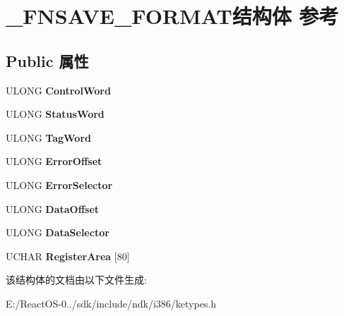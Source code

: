 \hypertarget{struct___f_n_s_a_v_e___f_o_r_m_a_t}{}\section{\+\_\+\+F\+N\+S\+A\+V\+E\+\_\+\+F\+O\+R\+M\+A\+T结构体 参考}
\label{struct___f_n_s_a_v_e___f_o_r_m_a_t}
\subsection*{Public 属性}
\begin{DoxyCompactItemize}
\item 
\mbox{\label{struct___f_n_s_a_v_e___f_o_r_m_a_t_a271b5eef143942d0124b66e91dc8d896}} 
U\+L\+O\+NG {\bfseries Control\+Word}
\item 
\mbox{\label{struct___f_n_s_a_v_e___f_o_r_m_a_t_a2450fb3d524034aa71d8af7565a6ac7a}} 
U\+L\+O\+NG {\bfseries Status\+Word}
\item 
\mbox{\label{struct___f_n_s_a_v_e___f_o_r_m_a_t_a028f79f9a88dfe9270a090e549135d46}} 
U\+L\+O\+NG {\bfseries Tag\+Word}
\item 
\mbox{\label{struct___f_n_s_a_v_e___f_o_r_m_a_t_a6805826043e53f9fd5b57f3bca22132d}} 
U\+L\+O\+NG {\bfseries Error\+Offset}
\item 
\mbox{\label{struct___f_n_s_a_v_e___f_o_r_m_a_t_a64fafbe9cf2dd89410d27ed52f0d86a1}} 
U\+L\+O\+NG {\bfseries Error\+Selector}
\item 
\mbox{\label{struct___f_n_s_a_v_e___f_o_r_m_a_t_a3081d555487a66e1555b69d1e7921725}} 
U\+L\+O\+NG {\bfseries Data\+Offset}
\item 
\mbox{\label{struct___f_n_s_a_v_e___f_o_r_m_a_t_a607d6e3a6131fdf6ce3d70ef69a8b929}} 
U\+L\+O\+NG {\bfseries Data\+Selector}
\item 
\mbox{\label{struct___f_n_s_a_v_e___f_o_r_m_a_t_a39c6b4de8d3ddf2361e72930966dab35}} 
U\+C\+H\+AR {\bfseries Register\+Area} \mbox{[}80\mbox{]}
\end{DoxyCompactItemize}


该结构体的文档由以下文件生成\+:\begin{DoxyCompactItemize}
\item 
E\+:/\+React\+O\+S-\/0../sdk/include/ndk/i386/ketypes.\+h\end{DoxyCompactItemize}
